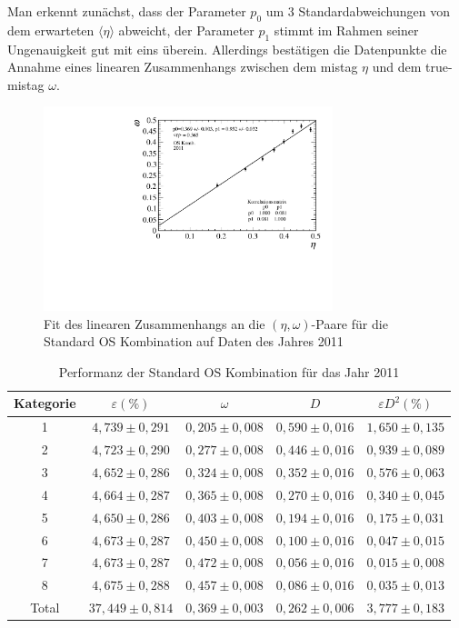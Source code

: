 Man erkennt zunächst, dass der Parameter $p_0$ um \num{3} Standardabweichungen von dem erwarteten $\langle\eta\rangle$ abweicht, der Parameter $p_1$ stimmt im Rahmen seiner Ungenauigkeit gut mit eins überein. Allerdings bestätigen die Datenpunkte die Annahme eines linearen Zusammenhangs zwischen dem mistag $\eta$ und dem true-mistag $\omega$. 
\begin{figure}[htbp]
	\centering
		\includegraphics[width=0.75\textwidth]{fig/2011_OScomb.pdf}
	\caption{Fit des linearen Zusammenhangs an die $(\eta,\omega)$-Paare für die Standard OS Kombination auf Daten des Jahres \num{2011}}
	\label{fig:2011_OScomb} 
\end{figure} 
\begin{table}[htbp]
	\centering
	\caption{Performanz der Standard OS Kombination für das Jahr \num{2011}}
	\label{tab:2011_OScomb}
	\begin{tabular}{ccccc}
	\toprule
       Kategorie & $\varepsilon(\%)$ & $\omega$ & $D$ & $\varepsilon D^2(\%)$ \\ 
       \midrule 
       1 & $4{,}739\pm0{,}291$ & $0{,}205\pm0{,}008$ & $0{,}590\pm0{,}016$ & $1{,}650\pm0{,}135$\\
       2 & $4{,}723\pm0{,}290$ & $0{,}277\pm0{,}008$ & $0{,}446\pm0{,}016$ & $0{,}939\pm0{,}089$\\ 
       3 & $4{,}652\pm0{,}286$ & $0{,}324\pm0{,}008$ & $0{,}352\pm0{,}016$ & $0{,}576\pm0{,}063$\\ 
       4 & $4{,}664\pm0{,}287$ & $0{,}365\pm0{,}008$ & $0{,}270\pm0{,}016$ & $0{,}340\pm0{,}045$\\ 
       5 & $4{,}650\pm0{,}286$ & $0{,}403\pm0{,}008$ & $0{,}194\pm0{,}016$ & $0{,}175\pm0{,}031$\\ 
       6 & $4{,}673\pm0{,}287$ & $0{,}450\pm0{,}008$ & $0{,}100\pm0{,}016$ & $0{,}047\pm0{,}015$\\ 
       7 & $4{,}673\pm0{,}287$ & $0{,}472\pm0{,}008$ & $0{,}056\pm0{,}016$ & $0{,}015\pm0{,}008$\\ 
       8 & $4{,}675\pm0{,}288$ & $0{,}457\pm0{,}008$ & $0{,}086\pm0{,}016$ & $0{,}035\pm0{,}013$\\ 
       \midrule
   Total & $37{,}449\pm0{,}814$& $0{,}369\pm0{,}003$ & $0{,}262\pm0{,}006$ & $3{,}777\pm0{,}183$\\ 
   \bottomrule
	\end{tabular}
\end{table}
